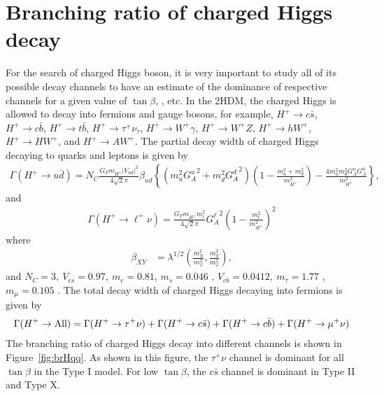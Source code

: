 \section{Branching ratio of charged Higgs decay}
\label{s:brHqq}
For the search of charged Higgs boson, it is very important to study all of its 
possible decay channels to have an estimate of the dominance of respective
channels for a given value of $\tan\beta$, \mHp, etc. In the 2HDM, the charged
Higgs is allowed to decay into fermions and gauge bosons, for example, 
$H^+ \rightarrow c\bar{s}$, $H^+ \rightarrow c\bar{b}$, 
$H^+ \rightarrow t\bar{b}$, $H^+ \rightarrow \tau^+\nu_\tau$, 
$H^+ \rightarrow W^+\gamma$, $H^+ \rightarrow W^+Z$, $H^+ \rightarrow hW^+$, 
$H^+ \rightarrow HW^+$, and $H^+ \rightarrow AW^+$. The partial decay width of charged 
Higgs decaying to quarks and leptons is given by \cite{PhysRevD.80.015017}
\begin{align}
\Gamma(H^+\to u{\bar d}) = N_C
\frac{G_Fm_{H^\pm}^{}\left|V_{ud}\right|^2}{4\sqrt2\pi}\beta_{ud}^{}
\left\{\left(m_u^2{G^u_A}^2+m_d^2{G^d_A}^2\right)
\left(1-\frac{m_u^2+m_d^2}{m_{H^\pm}^2}\right)-\frac{4m_u^2m_d^2
{G^u_A}{G^d_A}}{m_{H^\pm}^2}\right\},
\label{Eq:H+ud}
\end{align}
and 
\begin{align}
\Gamma(H^+\to \ell^+\nu) =
\frac{G_Fm_{H^\pm}^{}m_\ell^2}{4\sqrt2\pi}{G^\ell_A}^2
\left(1-\frac{m_\ell^2}{m_{H^\pm}^2}\right)^2
\label{Eq:H+nul}
\end{align}
where 
\begin{align}
\beta_{XY}^{} &= \lambda^{1/2}\left(\frac{m_X^2}{m_\varphi^2},
\frac{m_Y^2}{m_\varphi^2}\right),
\end{align}
and $ N_C = 3, ~V_{cs} = 0.97, ~m_c = 0.81$\GeV, $m_s = 0.046$ \GeV, $V_{cb} = 
0.0412, ~m_\tau = 1.77$ \GeV, $m_\mu = 0.105$ \GeV. The total decay width of charged
Higgs decaying into fermions is given by
\begin{align}
\Gamma(H^+\to \rm{All}) = \Gamma(H^+\to \tau^+\nu) + \Gamma(H^+\to c\bar{s}) + 
\Gamma(H^+\to c\bar{b}) + \Gamma(H^+\to \mu^+\nu)
\end{align}
The branching ratio of charged Higgs decay into different channels is shown in
Figure~\ref{fig:brHqq}. As shown in this figure, the $\tau^+\nu$ channel is
dominant for all $\tan\beta$ in the Type I model. For low $\tan\beta$, the 
$c\bar{s}$ channel is dominant in Type II and Type X. 
